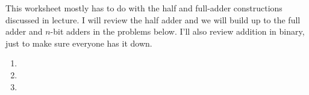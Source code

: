 This worksheet mostly has to do with the half and full-adder constructions discussed in lecture. I will review the half adder and we will build up to the full adder and $n$-bit adders in the problems below. I'll also review addition in binary, just to make sure everyone has it down. 
 \begin{enumerate}
   \item 
   \item 
   \item 
 \end{enumerate}
